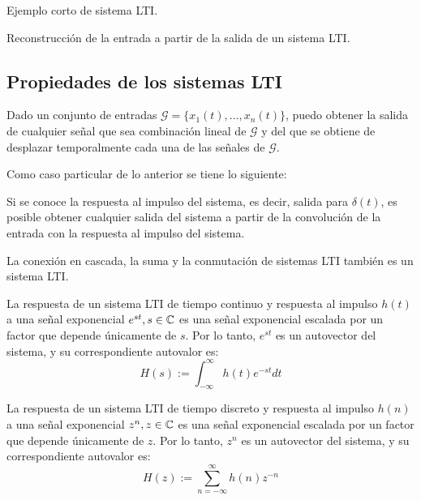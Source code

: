 \begin{example}
    Ejemplo corto de sistema LTI.
\end{example}

\begin{example}
    Reconstrucción de la entrada a partir de la salida de un sistema LTI.
\end{example}

\subsection*{Propiedades de los sistemas LTI}

\begin{property}
    Dado un conjunto de entradas $\mathcal{G} = \{x_1(t),\ldots,x_n(t)\}$, puedo obtener la salida de cualquier señal que sea combinación lineal de $\mathcal{G}$ y del que se obtiene de desplazar temporalmente cada una de las señales de $\mathcal{G}$.
\end{property}

Como caso particular de lo anterior se tiene lo siguiente:

\begin{property}[Convolución]
    Si se conoce la respuesta al impulso del sistema, es decir, salida para $\delta(t)$, es posible obtener cualquier salida del sistema a partir de la convolución de la entrada con la respuesta al impulso del sistema.
\end{property}

\begin{property}
    La conexión en cascada, la suma y la conmutación de sistemas LTI también es un sistema LTI. 
\end{property}

\begin{property}
    La respuesta de un sistema LTI de tiempo continuo y respuesta al impulso $h(t)$ a una señal exponencial $e^{st}, s\in \mathbb{C}$ es una señal exponencial escalada por un factor que depende únicamente de $s$. Por lo tanto, $e^{st}$ es un autovector del sistema, y su correspondiente autovalor es:
    \begin{equation*}
        H(s) := \int_{-\infty}^{\infty} h(t)e^{-st}dt
    \end{equation*}
\end{property}

\begin{property}
    La respuesta de un sistema LTI de tiempo discreto y respuesta al impulso $h(n)$ a una señal exponencial $z^{n}, z \in \mathbb{C}$ es una señal exponencial escalada por un factor que depende únicamente de $z$. Por lo tanto, $z^{n}$ es un autovector del sistema, y su correspondiente autovalor es:
    \begin{equation*}
        H(z) := \sum_{n=-\infty}^{\infty} h(n)z^{-n}
    \end{equation*}
\end{property}

